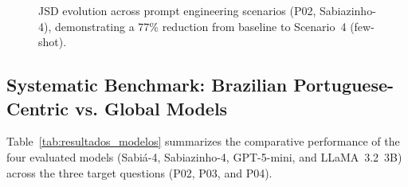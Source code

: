 \begin{figure}[htbp]
    \centering
    \resizebox{\columnwidth}{!}{%
    }
    \caption{JSD evolution across prompt engineering scenarios (P02,
        Sabiazinho-4), demonstrating a 77\% reduction from baseline to
        Scenario~4 (few-shot).}
    \label{fig:evolucao_jsd}
\end{figure}

\subsection{Systematic Benchmark: Brazilian Portuguese-Centric vs. Global Models}
\label{subsec:resultados_modelos}

Table~\ref{tab:resultados_modelos} summarizes the comparative performance of
the four evaluated models (Sabiá-4, Sabiazinho-4, GPT-5-mini, and
LLaMA~3.2~3B) across the three target questions (P02, P03, and P04).

